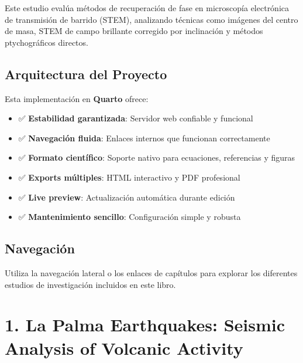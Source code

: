 \documentclass[
  letterpaper,
]{book}
\providecommand{\tightlist}{%
  \setlength{\itemsep}{0pt}\setlength{\parskip}{0pt}}
\begin{document}

Este estudio evalúa métodos de recuperación de fase en microscopía
electrónica de transmisión de barrido (STEM), analizando técnicas como
imágenes del centro de masa, STEM de campo brillante corregido por
inclinación y métodos ptychográficos directos.

\section*{Arquitectura del Proyecto}\label{arquitectura-del-proyecto}


Esta implementación en \textbf{Quarto} ofrece:

\begin{itemize}
\tightlist
\item
  ✅ \textbf{Estabilidad garantizada}: Servidor web confiable y
  funcional
\item
  ✅ \textbf{Navegación fluida}: Enlaces internos que funcionan
  correctamente
\item
  ✅ \textbf{Formato científico}: Soporte nativo para ecuaciones,
  referencias y figuras
\item
  ✅ \textbf{Exports múltiples}: HTML interactivo y PDF profesional
\item
  ✅ \textbf{Live preview}: Actualización automática durante edición
\item
  ✅ \textbf{Mantenimiento sencillo}: Configuración simple y robusta
\end{itemize}

\section*{Navegación}\label{navegaciuxf3n}


Utiliza la navegación lateral o los enlaces de capítulos para explorar
los diferentes estudios de investigación incluidos en este libro.


\chapter{1. La Palma Earthquakes: Seismic Analysis of Volcanic
Activity}\label{la-palma-earthquakes-seismic-analysis-of-volcanic-activity}
\end{document}
